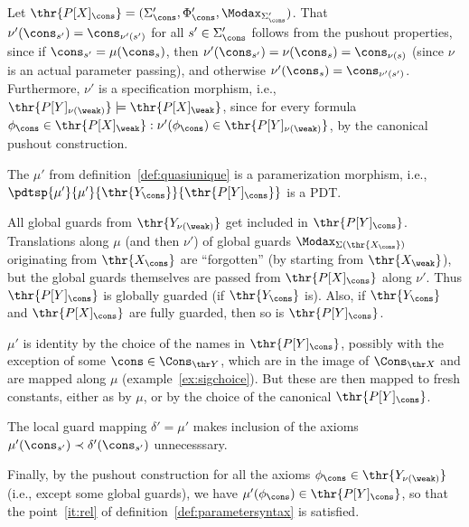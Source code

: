 \begin{PROOF}
Let $\thr{P[X]_\cons}= (\Sigma_\cons',\Phi'_\cons,\Modax_{\Sigma'_{\cons}})$.
That $\nu'(\cons_{s'}) = \cons_{\nu'(s')}$ for all $s' \in \Sigma_\cons'$
follows from the pushout properties, since if $\cons_{s'} = \mu(\cons_s)$, then
$\nu'(\cons_{s'})= \nu(\cons_s)= \cons_{\nu(s)}$ (since $\nu$ is an actual
parameter passing), and otherwise $\nu'(\cons_s) =
\cons_{\nu'(s')}$. Furthermore, $\nu'$ is a specification morphism, i.e.,
$\thr{P[Y]_{\nu(\weak)}} \models \thr{P[X]_\weak}$,  since
for every formula $\phi_\cons \in \thr{P[X]_\weak}:\nu'(\phi_\cons) \in
\thr{P[Y]_{\nu(\weak)}}$, by the canonical pushout construction.
\end{PROOF}
%
\begin{fact}\label{fa:paramtoo}
The $\mu'$ from definition~\ref{def:quasiunique}
is a paramerization morphism, i.e.,
$\pdtsp{\mu'}{\mu'}{\thr{Y_\cons}}{\thr{P[Y]_\cons}}$ is a PDT.
\end{fact} 
\begin{PROOF}
All global guards from $\thr{Y_{\nu(\weak)}}$ get included in
$\thr{P[Y]_\cons}$. 
Translations along $\mu$ (and then $\nu'$) of global guards
$\Modax_{\Sigma({\thr{X_{\cons}}})}$ originating from $\thr{X_\cons}$ are
``forgotten'' (by starting from $\thr{X_\weak}$), but the global guards
themselves are passed from $\thr{P[X]_\cons}$ along $\nu'$. 
Thus $\thr{P[Y]_\cons}$ is globally guarded (if $\thr{Y_\cons}$ is). Also, if
$\thr{Y_\cons}$ and $\thr{P[X]_\cons}$ are fully guarded, then so is $\thr{P[Y]_\cons}$.

$\mu'$ is identity by the choice of the names in $\thr{P[Y]_\cons}$, possibly
with the exception of some $\cons\in\Cons_{\thr Y}$, which are in the image of
 $\Cons_{\thr X}$ and are mapped along $\mu$
(example~\ref{ex:sigchoice}). But these are then mapped to fresh constants,
either as by $\mu$, or by the choice of the canonical $\thr{P[Y]_\cons}$.

The local guard mapping $\delta'=\mu'$ makes inclusion of the axioms 
$\mu'(\cons_{s'})\prec \delta'(\cons_{s'})$ unnecesssary. 

Finally, by the pushout construction for all
 the axioms  $\phi_\cons\in\thr{Y_{\nu(\weak)}}$
(i.e., except some global guards), we have
 $\mu'(\phi_\cons)\in\thr{P[Y]_\cons}$, so that the point~\ref{it:rel} of
definition~\ref{def:parametersyntax} is satisfied.
\end{PROOF}
